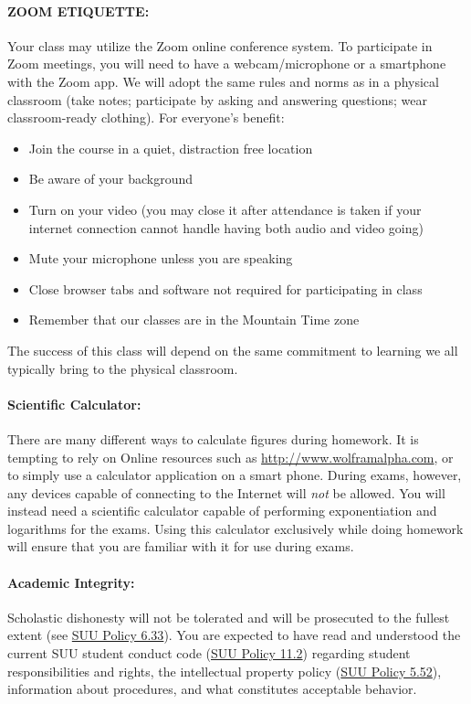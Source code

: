 \documentclass[12pt, letterpaper]{article}
\begin{document}
\paragraph{ZOOM ETIQUETTE:}
Your class may utilize the Zoom online conference system. To participate in Zoom meetings, you will need to have a webcam/microphone or a smartphone with the Zoom app. We will adopt the same rules and norms as in a physical classroom (take notes; participate by asking and answering questions; wear classroom-ready clothing). For everyone’s benefit:
\begin{itemize}
	\item Join the course in a quiet, distraction free location
	\item Be aware of your background
	\item Turn on your video (you may close it after attendance is taken if your internet connection cannot handle having both audio and video going)
	\item Mute your microphone unless you are speaking
	\item Close browser tabs and software not required for participating in class
	\item Remember that our classes are in the Mountain Time zone
\end{itemize}
The success of this class will depend on the same commitment to learning we all typically bring to the physical classroom.

\paragraph{Scientific Calculator:}
There are many different ways to calculate figures during homework. It is tempting to rely on Online resources such as \href{http://www.wolframalpha.com}{http://www.wolframalpha.com}, or to simply use a calculator application on a smart phone. During exams, however, any devices capable of connecting to the Internet will \emph{not} be allowed. You will instead need a scientific calculator capable of performing exponentiation and logarithms for the exams. Using this calculator exclusively while doing homework will ensure that you are familiar with it for use during exams.

\paragraph{Academic Integrity:}
Scholastic dishonesty will not be tolerated and will be prosecuted to the fullest extent (see \href{https://www.suu.edu/policies/06/33.html}{SUU Policy 6.33}). You are expected to have read and understood the current SUU student conduct code (\href{https://www.suu.edu/policies/11/02.html}{SUU Policy 11.2}) regarding student responsibilities and rights, the intellectual property policy (\href{https://www.suu.edu/policies/05/52.html}{SUU Policy 5.52}), information about procedures, and what constitutes acceptable behavior.
\end{document}
